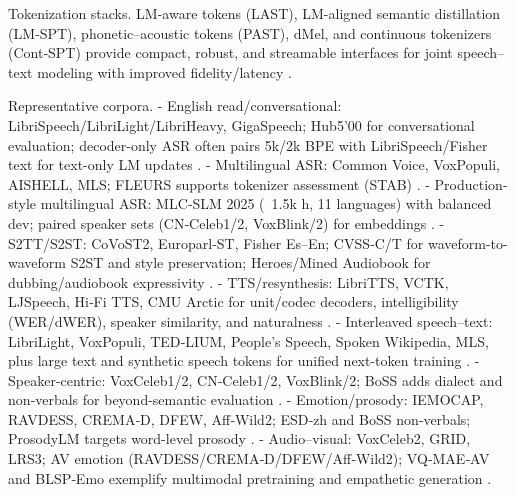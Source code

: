 \documentclass{article}
\begin{document}
Tokenization stacks. LM-aware tokens (LAST), LM-aligned semantic distillation (LM‑SPT), phonetic–acoustic tokens (PAST), dMel, and continuous tokenizers (Cont‑SPT) provide compact, robust, and streamable interfaces for joint speech–text modeling with improved fidelity/latency \cite{turetzky2024lastlanguagemodelawarespeechtokenization,jo2025lmsptalignedsemanticdistillationspeechto,har-tuv2025pastphoneticacousticspeechtokenizer,li2025continuousspeechtokenizertext,bai2025dmelspeechtokenizationmadesimple}.

Representative corpora.
- English read/conversational: LibriSpeech/LibriLight/LibriHeavy, GigaSpeech; Hub5’00 for conversational evaluation; decoder-only ASR often pairs 5k/2k BPE with LibriSpeech/Fisher text for text-only LM updates \cite{tsunoo2024decoderonlyarchitecturespeechrecognition}.
- Multilingual ASR: Common Voice, VoxPopuli, AISHELL, MLS; FLEURS supports tokenizer assessment (STAB) \cite{vashishth2024stabspeechtokenizerassessmentbenchmark}.
- Production-style multilingual ASR: MLC‑SLM 2025 (~1.5k h, 11 languages) with balanced dev; paired speaker sets (CN‑Celeb1/2, VoxBlink/2) for embeddings \cite{li2025seewossubmissionmlcslmlessonslearnedspee}.
- S2TT/S2ST: CoVoST2, Europarl‑ST, Fisher Es–En; CVSS‑C/T for waveform-to-waveform S2ST and style preservation; Heroes/Mined Audiobook for dubbing/audiobook expressivity \cite{peng2024mslms2stmultitaskspeechlanguagemodeltext,zhao2024textlessstreamingspeechtranslationsemant,huang2023holisticcascadesystembenchmarkhumanevalu,guo2025streamuniachievingstreamingspeechtransla}.
- TTS/resynthesis: LibriTTS, VCTK, LJSpeech, Hi‑Fi TTS, CMU Arctic for unit/codec decoders, intelligibility (WER/dWER), speaker similarity, and naturalness \cite{turetzky2024lastlanguagemodelawarespeechtokenization,wang2023slmbridgethingapbetweenspeechtextfoundat,entry2025towardjointlanguagemodelingspeechunitste}.
- Interleaved speech–text: LibriLight, VoxPopuli, TED‑LIUM, People’s Speech, Spoken Wikipedia, MLS, plus large text and synthetic speech tokens for unified next-token training \cite{zeng2024scalingspeechtextpretrainingsyntheticint,maimon2025scalinganalysisinterleavedspeechtextlang,li2025continuousspeechtokenizertext,bai2025dmelspeechtokenizationmadesimple}.
- Speaker-centric: VoxCeleb1/2, CN‑Celeb1/2, VoxBlink/2; BoSS adds dialect and non‑verbals for beyond-semantic evaluation \cite{li2025seewossubmissionmlcslmlessonslearnedspee,wang2025bossbeyondsemanticspeech}.
- Emotion/prosody: IEMOCAP, RAVDESS, CREMA‑D, DFEW, Aff‑Wild2; ESD‑zh and BoSS non‑verbals; ProsodyLM targets word-level prosody \cite{qian2025prosodylmuncoveringemergingprosodyproces,wang2025bossbeyondsemanticspeech,vashishth2024stabspeechtokenizerassessmentbenchmark}.
- Audio–visual: VoxCeleb2, GRID, LRS3; AV emotion (RAVDESS/CREMA‑D/DFEW/Aff‑Wild2); VQ‑MAE‑AV and BLSP‑Emo exemplify multimodal pretraining and empathetic generation \cite{sadok2025vectorquantizedmaskedautoencoderaudiovis,wang2024blspemotowardsempatheticlargespeechlangu}.
\end{document}
